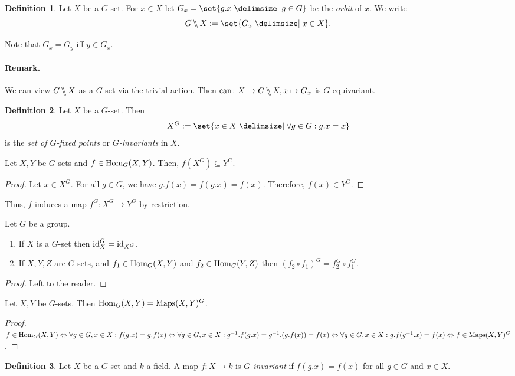 \documentclass[12pt,a4paper]{scrartcl}
\theoremstyle{cplain}
\theoremstyle{cplain}
\theoremstyle{cplain}
\theoremstyle{definition}
\newtheorem*{deff}{Definition}
\begin{document}
\begin{otherlanguage}{english}
\begin{deff}
  Let $X$ be a $G$-set. For $x\in X$ let $G_x = \set{g.x \given g \in G}$ be the \emph{orbit} of $x$. We write \[ \orbits GX := \set{G_x \given x \in X}.\]
\end{deff}
\medskip
Note that $G_x = G_y$ iff $y \in G_x$.

\paragraph{Remark.}
We can view $G\,\backslash\!\!\backslash\, X$ as a $G$-set via the trivial action. Then $\operatorname{can}\colon X \to G\,\backslash\!\!\backslash\, X,x \mapsto G_x$ is $G$-equivariant.

\begin{deff}
  Let $X$ be a $G$-set. Then \[X^G := \set{x \in X \given \forall g\in G: g.x = x}\] is the \emph{set of $G$-fixed points} or \emph{$G$-invariants} in $X$.
\end{deff}
\begin{lem}
  Let $X,Y$ be $G$-sets and $f\in \operatorname{Hom}_G(X,Y)$. Then, $f(X^G) \subseteq Y^G$.
\end{lem}
\begin{proof}
  Let $x\in X^G$. For all $g\in G$, we have $g.f(x) = f(g.x) = f(x)$. Therefore, $f(x) \in Y^G$.
\end{proof}

\medskip
Thus, $f$ induces a map $f^G\colon X^G \to Y^G$ by restriction.

\begin{lem}
  Let $G$ be a group.
  \begin{enumerate}
    \item If $X$ is a $G$-set then $\operatorname{id}_X^G = \operatorname{id}_{X^G}$.
    \item If $X,Y,Z$ are $G$-sets, and $f_1 \in \operatorname{Hom}_G(X,Y)$ and $f_2\in \operatorname{Hom}_G(Y,Z)$ then $(f_2\circ f_1)^G = f_2^G \circ f_1^G$.
  \end{enumerate}
\end{lem}
\begin{proof}
  Left to the reader.
\end{proof}
\begin{lem}
  Let $X,Y$ be $G$-sets. Then $\operatorname{Hom}_G(X,Y) = \operatorname{Maps}(X,Y)^G$.
\end{lem}
\begin{proof}
  $f \in \operatorname{Hom}_G(X,Y) \Leftrightarrow \forall g\in G,x \in X: f(g.x) = g.f(x) \Leftrightarrow \forall g\in G,x \in X:g^{-1}.f(g.x) = g^{-1}.(g.f(x)) = f(x) \Leftrightarrow \forall g\in G,x \in X: g.f(g^{-1}.x) = f(x) \Leftrightarrow f\in \operatorname{Maps}(X,Y)^G$.
\end{proof}
\begin{deff}
  Let $X$ be a $G$ set and $k$ a field. A map $f\colon X\to k $ is \emph{$G$-invariant} if $f(g.x) = f(x)$ for all $g \in G$ and $x\in X$.
\end{deff}


\end{otherlanguage}
\end{document}
